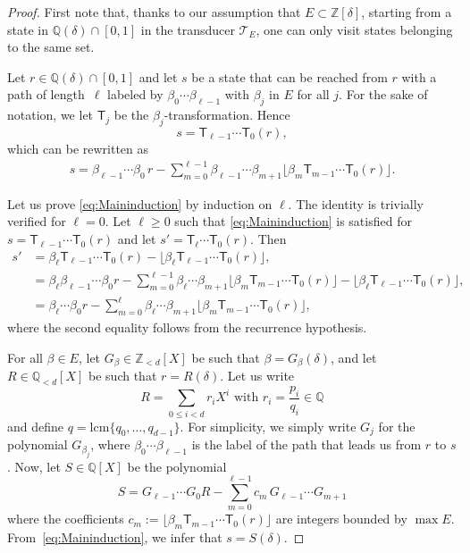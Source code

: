 \documentclass[12pt,reqno]{amsart}
\begin{document}
\begin{proof}
First note that, thanks to our assumption that $E\subset \mathbb{Z}[\delta]$, starting from a state in $\mathbb{Q}(\delta)\cap[0,1]$ in the transducer $\mathcal{T}_E$, one can only visit states belonging to the same set. 

Let $r\in\mathbb{Q}(\delta)\cap [0,1]$ and let $s$ be a state that can be reached from $r$ with a path of length~$\ell$ labeled by $\beta_0\cdots \beta_{\ell-1}$ with $\beta_j$ in $E$ for all $j$. For the sake of notation, we let $\mathsf{T}_j$ be the $\beta_j$-transformation. 
Hence 
\[
    s=\mathsf{T}_{\ell-1}  \cdots \mathsf{T}_0(r),
\]
which can be rewritten as 
\begin{align} \label{eq:Maininduction}
    s= \beta_{\ell-1} \cdots \beta_0\, r - \sum_{m=0}^{\ell-1}  \beta_{\ell-1} \cdots \beta_{m+1}
\lfloor \beta_m \mathsf{T}_{m-1}\cdots \mathsf{T}_0(r)\rfloor.
\end{align} 

Let us prove \eqref{eq:Maininduction} by induction on $\ell$. The identity is trivially verified for $\ell=0$. Let $\ell\geq 0$ such that \eqref{eq:Maininduction} is satisfied for $s=\mathsf{T}_{\ell-1}  \cdots \mathsf{T}_0(r)$ and let $s'=\mathsf{T}_{\ell} \cdots \mathsf{T}_0(r)$. Then
\begin{align*}
    s'&=\beta_{\ell}\mathsf{T}_{\ell-1}  \cdots \mathsf{T}_0(r) - \lfloor \beta_\ell \mathsf{T}_{\ell-1}  \cdots \mathsf{T}_0(r) \rfloor, \\
    &=\beta_\ell\beta_{\ell-1} \cdots \beta_0 r - \sum_{m=0}^{\ell-1}\beta_\ell \cdots \beta_{m+1}
    \lfloor \beta_m \mathsf{T}_{m-1}\cdots \mathsf{T}_0(r)\rfloor - \lfloor \beta_\ell \mathsf{T}_{\ell-1}  \cdots \mathsf{T}_0(r) \rfloor,\\
    & =\beta_\ell \cdots \beta_0 r - \sum_{m=0}^{\ell}\beta_\ell \cdots \beta_{m+1}
    \lfloor \beta_m \mathsf{T}_{m-1}\cdots \mathsf{T}_0(r)\rfloor,
\end{align*} 
where the second equality follows from the recurrence hypothesis.

For all $\beta\in E$, let $G_\beta\in\mathbb{Z}_{<d}[X]$ be such that $\beta=G_\beta(\delta)$, and let $R\in\mathbb{Q}_{<d}[X]$ be such that $r=R(\delta)$. 
Let us write 
\[
    R=\sum_{0\le i < d}r_iX^{i}
    \text{ with }r_i=\frac{p_i}{q_i} \in \mathbb{Q}
\]
and define $q=\text{lcm}\{q_0,\ldots,q_{d-1}\}$. For simplicity, we simply write $G_j$ for the polynomial $G_{\beta_j}$, where $\beta_0\cdots\beta_{\ell-1}$ is the label of the path that leads us from $r$ to $s$. Now, let $S\in\mathbb{Q}[X]$ be the polynomial 
\begin{equation}
  \label{eq:S}
  S=G_{\ell-1} \cdots G_0 R-\sum_{m=0}^{\ell-1}  c_m \, G_{\ell-1} \cdots G_{m+1}
\end{equation}
where the coefficients $c_m:=\lfloor \beta_m \mathsf{T}_{m-1}\cdots \mathsf{T}_0(r)\rfloor$ are integers bounded by $\max E$. From~\eqref{eq:Maininduction}, we infer that $s=S(\delta)$. 


\end{proof}
\end{document}
